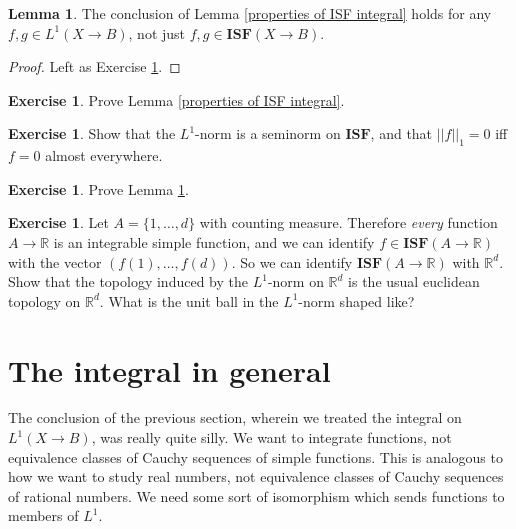 \documentclass[12pt]{book}
\newcommand{\RR}{\mathbb{R}}
\newcommand{\ISF}{\mathbf{ISF}}
\theoremstyle{definition}
\newtheorem{lemma}[theorem]{Lemma}
\newtheorem{exercise}[theorem]{Exercise}
\begin{document}
\begin{lemma}
\label{properties of ISF integral 2}
The conclusion of Lemma \ref{properties of ISF integral} holds for any $f,g \in L^1(X \to B)$, not just $f,g \in \ISF(X \to B)$.
\end{lemma}
\begin{proof}
Left as Exercise \ref{integral props exer 2}.
\end{proof}

\begin{exercise}
\label{integral props exer 1}
Prove Lemma \ref{properties of ISF integral}.
\end{exercise}

\begin{exercise}
\label{L1 norm exer}
Show that the $L^1$-norm is a seminorm on $\ISF$, and that $||f||_1 = 0$ iff $f = 0$ almost everywhere.
\end{exercise}

\begin{exercise}
\label{integral props exer 2}
Prove Lemma \ref{properties of ISF integral 2}.
\end{exercise}

\begin{exercise}
Let $A = \{1, \dots, d\}$ with counting measure. Therefore \emph{every} function $A \to \RR$ is an integrable simple function, and we can identify $f \in \ISF(A \to \RR)$ with the vector $(f(1), \dots, f(d))$.
So we can identify $\ISF(A \to \RR)$ with $\RR^d$.
Show that the topology induced by the $L^1$-norm on $\RR^d$ is the usual euclidean topology on $\RR^d$.
What is the unit ball in the $L^1$-norm shaped like?
\end{exercise}

\section{The integral in general}
The conclusion of the previous section, wherein we treated the integral on $L^1(X \to B)$, was really quite silly.
We want to integrate functions, not equivalence classes of Cauchy sequences of simple functions.
This is analogous to how we want to study real numbers, not equivalence classes of Cauchy sequences of rational numbers.
We need some sort of isomorphism which sends functions to members of $L^1$.
\end{document}
